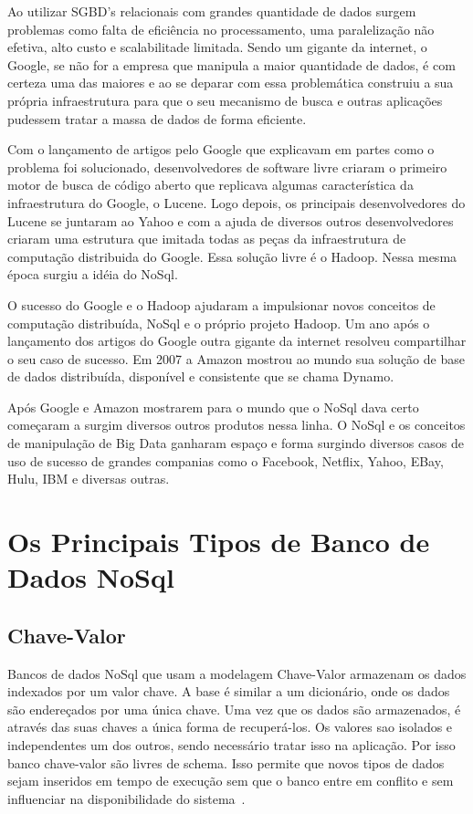 Ao utilizar SGBD's relacionais com grandes quantidade de dados surgem problemas como falta de eficiência no processamento, uma paralelização não efetiva, alto custo e scalabilitade limitada. Sendo um gigante da internet, o Google,  se não for a empresa que manipula a maior quantidade de dados, é com certeza uma das maiores e ao se deparar com essa problemática  construiu a sua própria infraestrutura para que o seu mecanismo de busca e outras aplicações pudessem tratar a massa de dados de forma eficiente.

Com o lançamento de artigos pelo Google que explicavam em partes como o problema foi solucionado, desenvolvedores de software livre criaram o primeiro motor de busca de código aberto que replicava algumas característica da infraestrutura do Google, o Lucene. Logo depois, os principais desenvolvedores do Lucene se juntaram ao Yahoo e com a ajuda de diversos outros desenvolvedores criaram uma estrutura que imitada todas as peças da infraestrutura de computação distribuida do 
Google. Essa solução livre é o Hadoop. Nessa mesma época surgiu a idéia do NoSql. 

O sucesso do Google e o Hadoop ajudaram a impulsionar novos conceitos de computação distribuída, NoSql e o próprio projeto Hadoop. Um ano após o lançamento dos artigos do Google outra gigante da internet resolveu compartilhar o seu caso de sucesso. Em 2007 a Amazon mostrou ao mundo sua solução de base de dados distribuída, disponível e consistente que se chama Dynamo.

Após Google e Amazon mostrarem para o mundo que o NoSql dava certo começaram a surgim diversos outros produtos nessa linha. O NoSql e os conceitos de manipulação de Big Data ganharam espaço e forma surgindo diversos casos de uso de sucesso de grandes companias como o Facebook, Netflix, Yahoo, EBay, Hulu, IBM e diversas outras.



\section{Os Principais Tipos de Banco de Dados NoSql}


\subsection{Chave-Valor}

Bancos de dados NoSql que usam a modelagem Chave-Valor armazenam os dados indexados por um valor chave. A base é similar a um dicionário, onde os dados são endereçados por uma única chave. Uma vez que os dados são armazenados, é através das suas chaves a única forma de recuperá-los. Os valores sao isolados e independentes um dos outros, sendo necessário tratar isso na aplicação. Por isso banco chave-valor são livres de schema. Isso permite que novos tipos de dados sejam inseridos em tempo de execução sem que o banco entre em conflito e sem influenciar na disponibilidade do sistema~\cite{nosqlevaluation,nosqlliveup}.

